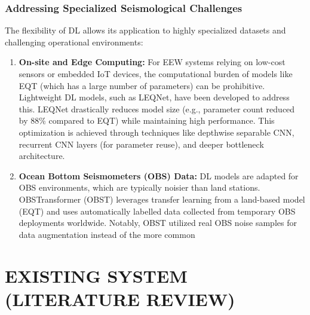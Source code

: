 \documentclass[a4paper,12pt]{report}
\begin{document}
\subsection{Addressing Specialized Seismological Challenges}
\label{sec:1.3.2}

The flexibility of DL allows its application to highly specialized datasets and challenging operational environments:
\begin{enumerate}
\item \textbf{On-site and Edge Computing:} For EEW systems relying on low-cost sensors or embedded IoT devices, the computational burden of models like EQT (which has a large number of parameters) can be prohibitive. Lightweight DL models, such as LEQNet, have been developed to address this. LEQNet drastically reduces model size (e.g., parameter count reduced by 88\% compared to EQT) while maintaining high performance. This optimization is achieved through techniques like depthwise separable CNN, recurrent CNN layers (for parameter reuse), and deeper bottleneck architecture.
\item \textbf{Ocean Bottom Seismometers (OBS) Data:} DL models are adapted for OBS environments, which are typically noisier than land stations. OBSTransformer (OBST) leverages transfer learning from a land-based model (EQT) and uses automatically labelled data collected from temporary OBS deployments worldwide. Notably, OBST utilized real OBS noise samples for data augmentation instead of the more common
\end{enumerate}
\newpage

\begingroup
\newif\ifseisquakhidesections
\seisquakhidesectionstrue
\let\seisquakorigaddcontentsline\addcontentsline
\renewcommand{\addcontentsline}[3]{%
  \ifseisquakhidesections
    \ifstrequal{#2}{section}{}{%
      \seisquakorigaddcontentsline{#1}{#2}{#3}%
    }%
  \else
    \seisquakorigaddcontentsline{#1}{#2}{#3}%
  \fi
}
\chapter{EXISTING SYSTEM (LITERATURE REVIEW)}
\label{chap:literature_survey}

\end{document}
